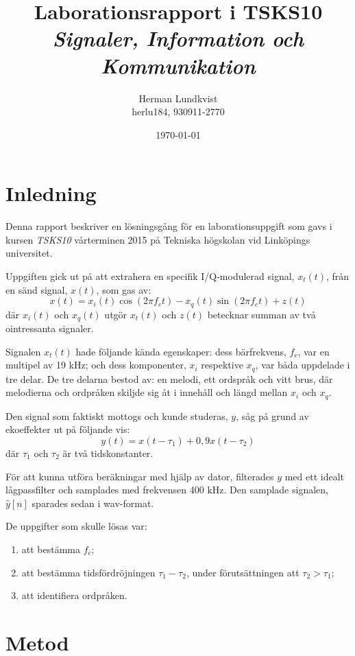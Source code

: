\documentclass[10pt,twocolumn,a4paper]{article}
\title{Laborationsrapport i TSKS10 \emph{Signaler, Information och Kommunikation}}
\author{Herman Lundkvist \\ herlu184, 930911-2770 }
\date{\today}
\begin{document}
\newcommand{\yhat}{$\hat{y}[n]$\xspace}

\maketitle

\section{Inledning}

Denna rapport beskriver en lösningsgång för en laborationsuppgift som gavs i
kursen \emph{TSKS10} vårterminen 2015 på Tekniska högskolan vid Linköpings
universitet.

Uppgiften gick ut på att extrahera en specifik I/Q-modulerad signal, $x_t(t)$,
från en sänd signal, $x(t)$, som gas av:
\begin{equation}
x(t) = x_i(t) \cos(2 \pi f_ct) - x_q(t) \sin(2 \pi f_c t) + z(t)
\label{e1}
\end{equation}
där $x_i(t)$ och $x_q(t)$ utgör $x_t(t)$ och $z(t)$ betecknar
summan av två ointressanta signaler.

Signalen $x_t(t)$ hade följande kända egenskaper: dess bärfrekvens, $f_c$,
var en multipel av 19 kHz; och dess komponenter, $x_i$ respektive $x_q$, var
båda uppdelade i tre delar. De tre delarna bestod av: en melodi, ett ordspråk
och vitt brus, där melodierna och ordpråken skiljde sig åt i innehåll och längd
mellan $x_i$ och $x_q$.

Den signal som faktiskt mottogs och kunde studeras, $y$, såg på grund av
ekoeffekter ut på följande vis:
\begin{equation}
    y(t)=x(t - \tau_1) + 0,9 x(t - \tau_2)
\end{equation}
där $\tau_1$ och $\tau_2$ är två tidskonstanter.

För att kunna utföra beräkningar med hjälp av dator, filterades $y$ 
med ett idealt lågpassfilter och samplades med frekvensen 400 kHz.
Den samplade signalen, \yhat sparades sedan i wav-format.

De uppgifter som skulle lösas var:
\begin{enumerate}
\item att bestämma $f_c$;
\item att bestämma tidsfördröjningen $\tau_1-\tau_2$, under förutsättningen att
$\tau_2 > \tau_1$;
\item att identifiera ordpråken.
\end{enumerate}

\section{Metod}
\end{document}
